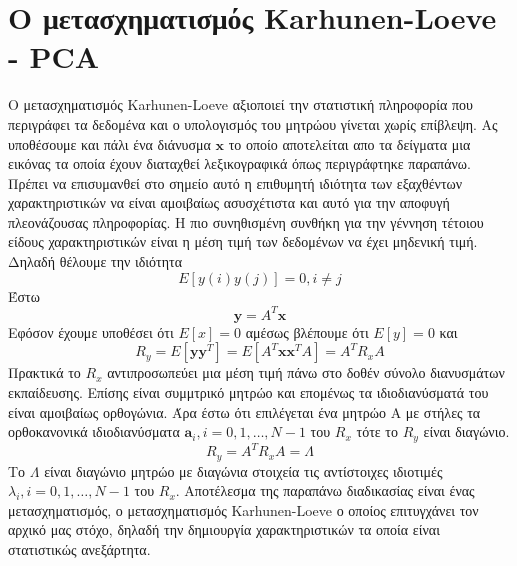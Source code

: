 \section{Ο μετασχηματισμός \textlatin{Karhunen-Loeve} - \textlatin{PCA}}
\par
Ο μετασχηματισμός \textlatin{Karhunen-Loeve} αξιοποιεί την στατιστική πληροφορία που περιγράφει τα δεδομένα και ο υπολογισμός του μητρώου γίνεται χωρίς επίβλεψη. Ας υποθέσουμε και πάλι ένα διάνυσμα $\mathbf{x}$ το οποίο αποτελείται απο τα δείγματα μια εικόνας τα οποία έχουν διαταχθεί λεξικογραφικά όπως περιγράφτηκε παραπάνω. Πρέπει να επισυμανθεί στο σημείο αυτό η επιθυμητή ιδιότητα των εξαχθέντων χαρακτηριστικών να είναι αμοιβαίως ασυσχέτιστα και αυτό για την αποφυγή πλεονάζουσας πληροφορίας. Η πιο συνηθισμένη συνθήκη για την γέννηση τέτοιου είδους χαρακτηριστικών είναι η μέση τιμή των δεδομένων να έχει μηδενική τιμή. Δηλαδή θέλουμε την ιδιότητα
\newline\hspace*{\fill}
\begin{equation}
        Ε[y(i)y(j)]=0,i \neq j
\end{equation}
\hspace*{\fill}\newline
Έστω 
\newline\hspace*{\fill}
\begin{equation}
        \mathbf{y} = A^{T}\mathbf{x}
\end{equation}
\hspace*{\fill}\newline
Εφόσον έχουμε υποθέσει ότι $Ε[x]=0$ αμέσως βλέπουμε ότι $Ε[y]=0$ και 
\newline\hspace*{\fill}
\begin{equation}
        R_{y}=E[\mathbf{y}\mathbf{y}^{T}]=E[A^{T} \mathbf{x}\mathbf{x}^{T} A]=A^{T}R_{x}A
\end{equation}
\hspace*{\fill}\newline
Πρακτικά το $R_{x}$ αντιπροσωπεύει μια μέση τιμή πάνω στο δοθέν σύνολο διανυσμάτων εκπαίδευσης. Επίσης είναι συμμτρικό μητρώο και επομένως τα ιδιοδιανύσματά του είναι αμοιβαίως ορθογώνια. Άρα έστω ότι επιλέγεται ένα μητρώο Α με στήλες τα ορθοκανονικά ιδιοδιανύσματα $\mathbf{a}_{i},i=0,1,\ldots,N-1$ του $R_{x}$  τότε το $R_{y}$ είναι διαγώνιο.
\newline\hspace*{\fill}
\begin{equation}
        R_{y}=A^{T}R_{x}A=\Lambda
\end{equation}
\hspace*{\fill}\newline
Το $\Lambda$ είναι διαγώνιο μητρώο με διαγώνια στοιχεία τις αντίστοιχες ιδιοτιμές $\lambda_{i},i=0,1,\ldots,N-1$ του $R_{x}$. Αποτέλεσμα της παραπάνω διαδικασίας είναι ένας μετασχηματισμός, ο μετασχηματισμός \textlatin{Karhunen-Loeve} ο οποίος επιτυγχάνει τον αρχικό μας στόχο, δηλαδή την δημιουργία χαρακτηριστικών τα οποία είναι στατιστικώς ανεξάρτητα.

